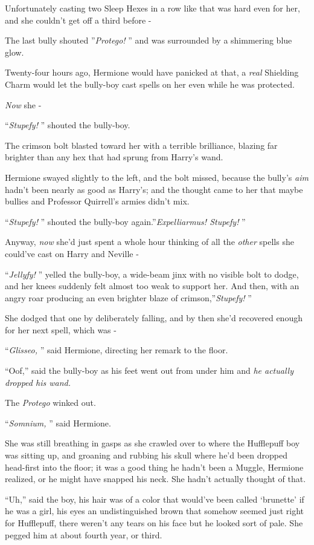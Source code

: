 Unfortunately casting two Sleep Hexes in a row like that was hard even
for her, and she couldn't get off a third before -

The last bully shouted ''\emph{Protego!} '' and was surrounded by a
shimmering blue glow.

Twenty-four hours ago, Hermione would have panicked at that, a
\emph{real} Shielding Charm would let the bully-boy cast spells on her
even while he was protected.

\emph{Now} she -

``\emph{Stupefy!} '' shouted the bully-boy.

The crimson bolt blasted toward her with a terrible brilliance, blazing
far brighter than any hex that had sprung from Harry's wand.

Hermione swayed slightly to the left, and the bolt missed, because the
bully's \emph{aim} hadn't been nearly as good as Harry's; and the
thought came to her that maybe bullies and Professor Quirrell's armies
didn't mix.

``\emph{Stupefy!} '' shouted the bully-boy again.''\emph{Expelliarmus!
Stupefy!} ''

Anyway, \emph{now} she'd just spent a whole hour thinking of all the
\emph{other} spells she could've cast on Harry and Neville -

``\emph{Jellyfy!} '' yelled the bully-boy, a wide-beam jinx with no
visible bolt to dodge, and her knees suddenly felt almost too weak to
support her. And then, with an angry roar producing an even brighter
blaze of crimson,''\emph{Stupefy!} ''

She dodged that one by deliberately falling, and by then she'd recovered
enough for her next spell, which was -

``\emph{Glisseo,} '' said Hermione, directing her remark to the floor.

``Oof,'' said the bully-boy as his feet went out from under him and
\emph{he actually dropped his wand.}

The \emph{Protego} winked out.

``\emph{Somnium,} '' said Hermione.

She was still breathing in gasps as she crawled over to where the
Hufflepuff boy was sitting up, and groaning and rubbing his skull where
he'd been dropped head-first into the floor; it was a good thing he
hadn't been a Muggle, Hermione realized, or he might have snapped his
neck. She hadn't actually thought of that.

``Uh,'' said the boy, his hair was of a color that would've been called
`brunette' if he was a girl, his eyes an undistinguished brown that
somehow seemed just right for Hufflepuff, there weren't any tears on his
face but he looked sort of pale. She pegged him at about fourth year, or
third.

